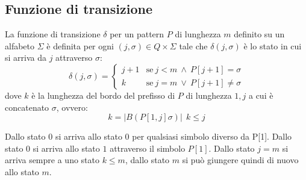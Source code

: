 \subsection{Funzione di transizione}
La funzione di transizione $\delta$ per un pattern $P$ di lunghezza $m$ definito su un alfabeto $\Sigma$ è definita per ogni $(j, \sigma) \in Q \times \Sigma$ tale che $\delta(j, \sigma)$ è lo stato in cui si arriva da $j$ attraverso $\sigma$:
\begin{equation}
    \delta(j, \sigma) = \begin{cases}
        j + 1 & \text{se} \ j < m \ \land \ P[j + 1] = \sigma \\
        k & \text{se} \ j = m \ \lor \ P[j + 1] \neq \sigma
    \end{cases}
\end{equation}
dove $k$ è la lunghezza del bordo del prefisso di $P$ di lunghezza $1, j$ a cui è concatenato $\sigma$, ovvero:
\begin{equation}
    k = |B(P[1, j]\sigma)| \ \ k \leq j
\end{equation}

Dallo stato $0$ si arriva allo stato $0$ per qualsiasi simbolo diverso da P[1]. Dallo stato $0$ si arriva allo stato $1$ attraverso il simbolo $P[1]$. Dallo stato $j = m$ si arriva sempre a uno stato $k \leq m$, dallo stato $m$ si può giungere quindi di nuovo allo stato $m$.
